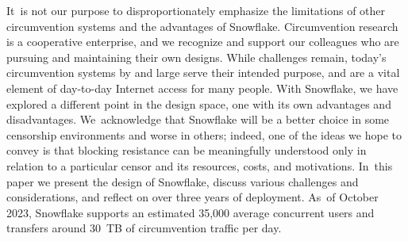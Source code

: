 \documentclass[letterpaper,twocolumn]{article}
\begin{document}
It~is not our purpose to disproportionately emphasize
the limitations of other circumvention systems
and the advantages of Snowflake.
Circumvention research is a cooperative enterprise,
and we recognize and support our colleagues who are
pursuing and maintaining their own designs.
While challenges remain,
today's circumvention systems by and large
serve their intended purpose,
and are a vital element of day-to-day Internet access for many people.
With Snowflake, we have explored a different point in the design space,
one with its own advantages and disadvantages.
We~acknowledge that Snowflake will be a better choice in some
censorship environments and
worse in others; indeed,
one of the ideas we hope to convey
is that blocking resistance
can be meaningfully understood only in relation to a particular censor
and its resources, costs, and motivations.
In~this paper we present the design of Snowflake,
discuss various challenges and considerations,
and reflect on over three years of deployment.
As~of October 2023, Snowflake supports an estimated 35,000 average concurrent users
and transfers around 30~TB of circumvention traffic per day.
\end{document}
